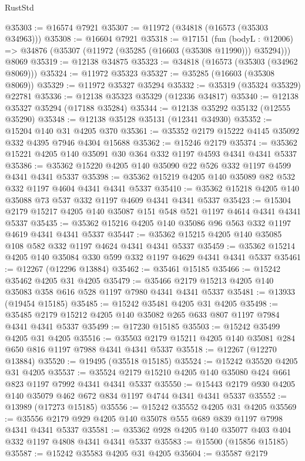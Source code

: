 \begin{lexlean}{RustStd}
\begin{coremodule}
@35303 := @16574 @7921
@35307 := @11972 (@34818 (@16573 (@35303 @34963)))
@35308 := @16604 @7921
@35318 := @17151
    (fun (bodyL : @12006) => @34876 (@35307 (@11972 (@35285 (@16603 (@35308 @11990))) @35294)))
    @8069
@35319 := @12138 @34875
@35323 := @34818 (@16573 (@35303 (@34962 @8069)))
@35324 := @11972 @35323
@35327 := @35285 (@16603 (@35308 @8069))
@35329 := @11972 @35327 @35294
@35332 := @35319 (@35324 @35329) @22781
@35336 := @12138 @35323 @35329 (@12336 @34817)
@35340 := @12138 @35327 @35294 (@17188 @35284)
@35344 := @12138 @35292 @35132 (@12555 @35290)
@35348 := @12138 @35128 @35131 (@12341 @34930)
@35352 := @15204 @140 @31 @4205 @370
@35361 := @35352 @2179 @15222 @4145 @35092 @332 @4395 @7946 @4304 @15688
@35362 := @15246 @2179
@35374 := @35362 @15221 @4205 @140 @35091 @30 @364 @332 @1197 @4593 @4341 @4341 @5337
@35386 := @35362 @15220 @4205 @140 @35090 @22 @526 @332 @1197 @4599 @4341 @4341 @5337
@35398 := @35362 @15219 @4205 @140 @35089 @82 @532 @332 @1197 @4604 @4341 @4341 @5337
@35410 := @35362 @15218 @4205 @140 @35088 @73 @537 @332 @1197 @4609 @4341 @4341 @5337
@35423 := @15304 @2179 @15217 @4205 @140 @35087 @151 @548 @521 @1197 @4614 @4341 @4341 @5337
@35435 := @35362 @15216 @4205 @140 @35086 @96 @563 @332 @1197 @4619 @4341 @4341 @5337
@35447 := @35362 @15215 @4205 @140 @35085 @108 @582 @332 @1197 @4624 @4341 @4341 @5337
@35459 := @35362 @15214 @4205 @140 @35084 @330 @599 @332 @1197 @4629 @4341 @4341 @5337
@35461 := @12267 (@12296 @13884)
@35462 := @35461 @15185
@35466 := @15242 @35462 @4205 @31 @4205
@35479 := @35466 @2179 @15213 @4205 @140 @35083 @358 @616 @528 @1197 @7980 @4341 @4341 @5337
@35481 := @13933 (@19454 @15185)
@35485 := @15242 @35481 @4205 @31 @4205
@35498 := @35485 @2179 @15212 @4205 @140 @35082 @265 @633 @807 @1197 @7984 @4341 @4341 @5337
@35499 := @17230 @15185
@35503 := @15242 @35499 @4205 @31 @4205
@35516 := @35503 @2179 @15211 @4205 @140 @35081 @284 @650 @816 @1197 @7988 @4341 @4341 @5337
@35518 := @12267 (@12270 @13884)
@35520 := @19495 (@35518 @15185)
@35524 := @15242 @35520 @4205 @31 @4205
@35537 := @35524 @2179 @15210 @4205 @140 @35080 @424 @661 @823 @1197 @7992 @4341 @4341 @5337
@35550 := @15443 @2179 @930 @4205 @140 @35079 @462 @672 @834 @1197 @4744 @4341 @4341 @5337
@35552 := @13989 (@17273 @15185)
@35556 := @15242 @35552 @4205 @31 @4205
@35569 := @35556 @2179 @929 @4205 @140 @35078 @555 @689 @839 @1197 @7998 @4341 @4341 @5337
@35581 := @35362 @928 @4205 @140 @35077 @403 @404 @332 @1197 @4808 @4341 @4341 @5337
@35583 := @15500 (@15856 @15185)
@35587 := @15242 @35583 @4205 @31 @4205
@35604 := @35587
    @2179

\end{coremodule}
\end{lexlean}
